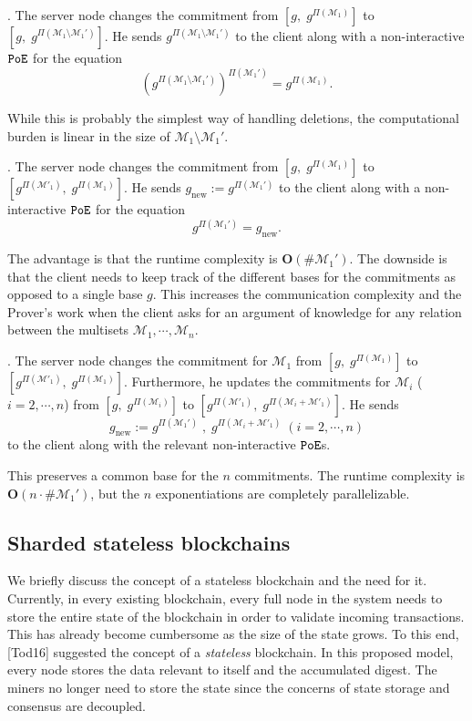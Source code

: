 \documentclass[11pt, lettersize, notitlepage, leqno, footskip=0.6cm]{article}
\newcommand{\mc}{\mathcal}
\newcommand{\mbf}{\mathbf}
\newcommand{\mr}{\mathrm}
\newcommand{\sm}{\setminus}
\newcommand{\vs}{\vspace{-0.15cm}}
\newcommand{\noin}{\noindent}
\numberwithin{equation}{section}
\begin{document}
\noin 1. The server node changes the commitment from $[g,\; g^{\Pi(\mc{M}_1)}]$ to $[g,\;g^{\Pi(\mc{M}_1\sm\mc{M}_1')}]$. He sends $g^{\Pi(\mc{M}_1\sm\mc{M}_1')}$ to the client along with a non-interactive $\tt{PoE}$ for the equation \vs $$(g^{\Pi(\mc{M}_1\sm\mc{M}_1')})^{\Pi(\mc{M}_1')} =   g^{\Pi(\mc{M}_1)}.$$

While this is probably the simplest way of handling deletions, the computational burden is linear in the size of $\mc{M}_1\sm\mc{M}_1'$.
\vspace{0.1cm}

\noin 2. The server node changes the commitment from $[g,\; g^{\Pi(\mc{M}_1)}]$ to $[g^{\Pi(\mc{M}'_1)},\; g^{\Pi(\mc{M}_1)}]$. He sends $g_{\mr{new}}:= g^{\Pi(\mc{M}_1')}$ to the client along with a non-interactive $\tt{PoE}$ for the equation \vs $$g^{\Pi(\mc{M}_1')} =   g_{\mr{new}}.$$

The advantage is that the runtime complexity is $\mbf{O}(\#\mc{M}_1')$. The downside is that the client needs to keep track of the different bases for the commitments as opposed to a single base $g$. This increases the communication complexity and the Prover's work when the client asks for an argument of knowledge for any relation between the multisets $\mc{M}_1,\cdots,\mc{M}_n$. 

\vspace{0.1cm}

\noin 3. The server node changes the commitment for $\mc{M}_1$ from $[g,\; g^{\Pi(\mc{M}_1)}]$ to\\ $[g^{\Pi(\mc{M}'_1)},\; g^{\Pi(\mc{M}_1)}]$. Furthermore, he updates the commitments for $\mc{M}_i$ ($i=2,\cdots,n$) from $[g,\; g^{\Pi(\mc{M}_i)}]$ to $[g^{\Pi(\mc{M}'_1)},\; g^{\Pi(\mc{M}_i+\mc{M}'_1)}]$. He sends \vs $$g_{\mr{new}}:= g^{\Pi(\mc{M}_1')}\;,\;g^{\Pi(\mc{M}_i+\mc{M}'_1)}\;(i=2,\cdots,n)$$ to the client along with the relevant non-interactive $\tt{PoE}$s.

This preserves a common base for the $n$ commitments. The runtime complexity is $\mbf{O}(n\cdot \#\mc{M}_1')$, but the $n$ exponentiations are completely parallelizable.


\subsection{\fontsize{11}{11} Sharded stateless blockchains}


We briefly discuss the concept of a stateless blockchain and the need for it. Currently, in every existing blockchain, every full node in the system needs to store the entire state of the blockchain in order to validate incoming transactions. This has already become cumbersome as the size of the state grows. To this end, [Tod16] suggested the concept of a \textit{stateless} blockchain. In this proposed model, every node stores the data relevant to itself and the accumulated digest. The miners no longer need to store the state since the concerns of state storage and consensus are decoupled.
\end{document}
